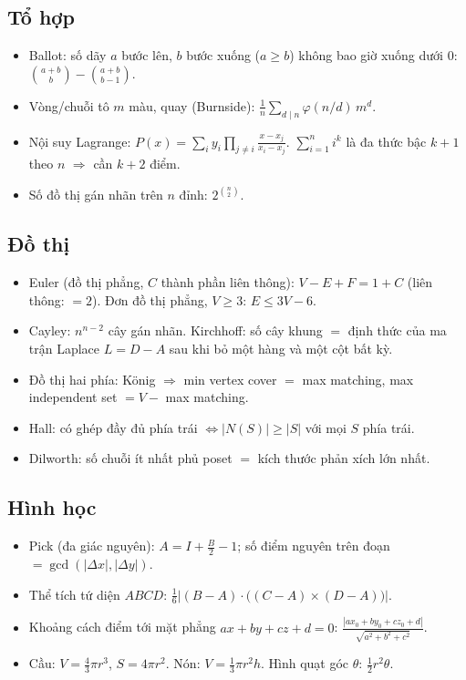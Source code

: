 \subsection{Tổ hợp}
\begin{itemize}
\item Ballot: số dãy $a$ bước lên, $b$ bước xuống ($a\ge b$) không bao giờ xuống dưới 0:
      $\binom{a+b}{b}-\binom{a+b}{b-1}$.
\item Vòng/chuỗi tô $m$ màu, quay (Burnside): $\frac1n\sum_{d\mid n}\varphi(n/d)\,m^{d}$.
\item Nội suy Lagrange: $P(x)=\sum_i y_i\prod_{j\ne i}\frac{x-x_j}{x_i-x_j}$.
      $\sum_{i=1}^n i^k$ là đa thức bậc $k+1$ theo $n$ $\Rightarrow$ cần $k+2$ điểm.
\item Số đồ thị gán nhãn trên $n$ đỉnh: $2^{\binom n2}$.
\end{itemize}

\subsection{Đồ thị}
\begin{itemize}
\item Euler (đồ thị phẳng, $C$ thành phần liên thông): $V-E+F=1+C$ (liên thông: $=2$).
      Đơn đồ thị phẳng, $V\ge3$: $E\le 3V-6$.
\item Cayley: $n^{n-2}$ cây gán nhãn. Kirchhoff: số cây khung $=$ định thức của
      ma trận Laplace $L=D-A$ sau khi bỏ một hàng và một cột bất kỳ.
\item Đồ thị hai phía: König $\Rightarrow$ min vertex cover $=$ max matching,
      max independent set $=V-$ max matching.
\item Hall: có ghép đầy đủ phía trái $\iff |N(S)|\ge|S|$ với mọi $S$ phía trái.
\item Dilworth: số chuỗi ít nhất phủ poset $=$ kích thước phản xích lớn nhất.
\end{itemize}

\subsection{Hình học}
\begin{itemize}
\item Pick (đa giác nguyên): $A=I+\frac B2-1$; số điểm nguyên trên đoạn
      $=\gcd(|\Delta x|,|\Delta y|)$.
\item Thể tích tứ diện $ABCD$: $\frac16\left|(B-A)\cdot\big((C-A)\times(D-A)\big)\right|$.
\item Khoảng cách điểm tới mặt phẳng $ax+by+cz+d=0$: $\frac{|ax_0+by_0+cz_0+d|}{\sqrt{a^2+b^2+c^2}}$.
\item Cầu: $V=\frac43\pi r^3$, $S=4\pi r^2$. Nón: $V=\frac13\pi r^2h$.
      Hình quạt góc $\theta$: $\frac12r^2\theta$.
\end{itemize}
